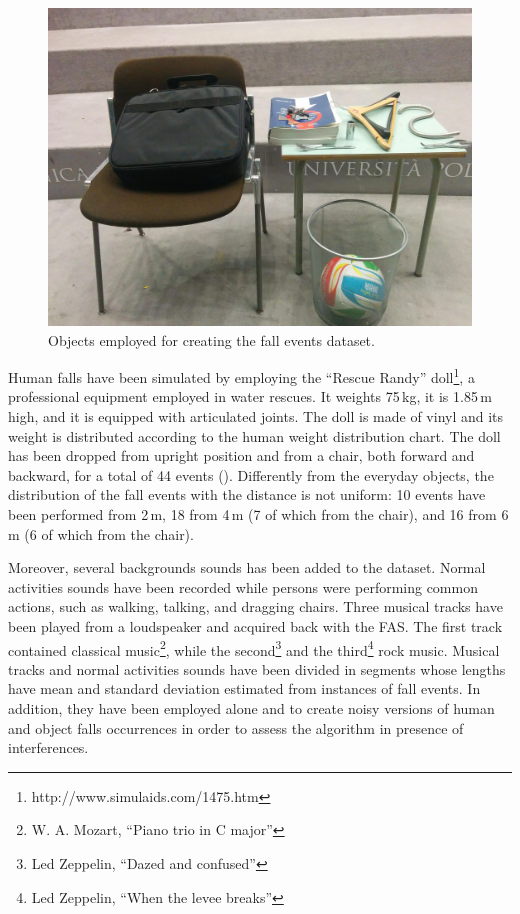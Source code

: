\begin{figure}[t]
	\centering
	\includegraphics[width=\textwidth]{img/objects_R1_R2.jpg}
	\caption{Objects employed for creating the fall events dataset.}\label{fig:objects}
\end{figure}

Human falls have been simulated by employing the ``Rescue Randy'' doll\footnote{http://www.simulaids.com/1475.htm}, a professional equipment employed in water rescues. It weights 75\,kg, it is 1.85\,m high, and it is equipped with articulated joints. The doll is made of vinyl and its weight is distributed according to the human weight distribution chart. The doll has been dropped from upright position and from a chair, both forward and backward, for a total of 44 events (). Differently from the everyday objects, the distribution of the fall events with the distance is not uniform: 10 events have been performed from 2\,m, 18 from 4\,m (7 of which from the chair), and 16 from 6\,m (6 of which from the chair).

Moreover, several backgrounds sounds has been added to the dataset. 
Normal activities sounds have been recorded while persons were performing common actions, such as walking, talking, and dragging chairs. Three musical tracks have been played from a loudspeaker and acquired back with the FAS. The first track contained classical music\footnote{W. A. Mozart, ``Piano trio in C major''}, while the second\footnote{Led Zeppelin, ``Dazed and confused''} and the third\footnote{Led Zeppelin, ``When the levee breaks''} rock music. Musical tracks and normal activities sounds have been divided in segments whose lengths have mean and standard deviation estimated from instances of fall events. In addition, they have been employed alone and to create noisy versions of human and object falls occurrences in order to assess the algorithm in presence of interferences. 

